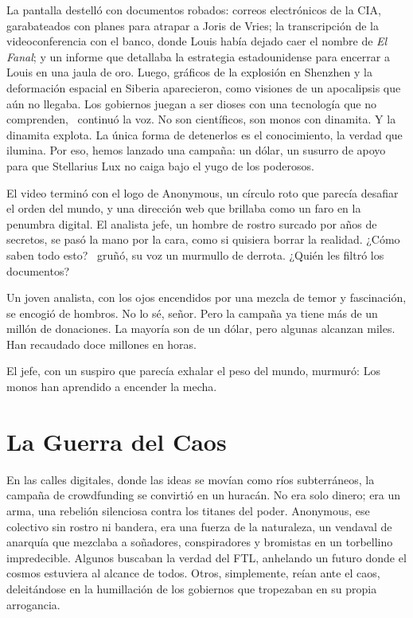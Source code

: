 La pantalla destelló con documentos robados: correos electrónicos de la CIA, garabateados con planes para atrapar a Joris de Vries; la transcripción de la videoconferencia con el banco, donde Louis había dejado caer el nombre de \emph{El Fanal}; y un informe que detallaba la estrategia estadounidense para encerrar a Louis en una jaula de oro. Luego, gráficos de la explosión en Shenzhen y la deformación espacial en Siberia aparecieron, como visiones de un apocalipsis que aún no llegaba. \glqq Los gobiernos juegan a ser dioses con una tecnología que no comprenden,\grqq~ continuó la voz. \glqq No son científicos, son monos con dinamita. Y la dinamita explota. La única forma de detenerlos es el conocimiento, la verdad que ilumina. Por eso, hemos lanzado una campaña: un dólar, un susurro de apoyo para que Stellarius Lux no caiga bajo el yugo de los poderosos.\grqq

El video terminó con el logo de Anonymous, un círculo roto que parecía desafiar el orden del mundo, y una dirección web que brillaba como un faro en la penumbra digital. El analista jefe, un hombre de rostro surcado por años de secretos, se pasó la mano por la cara, como si quisiera borrar la realidad. \glqq ¿Cómo saben todo esto?\grqq~ gruñó, su voz un murmullo de derrota. \glqq ¿Quién les filtró los documentos?\grqq

Un joven analista, con los ojos encendidos por una mezcla de temor y fascinación, se encogió de hombros. \glqq No lo sé, señor. Pero la campaña ya tiene más de un millón de donaciones. La mayoría son de un dólar, pero algunas alcanzan miles. Han recaudado doce millones en horas.\grqq

El jefe, con un suspiro que parecía exhalar el peso del mundo, murmuró: \glqq Los monos han aprendido a encender la mecha.\grqq

\section{La Guerra del Caos}

En las calles digitales, donde las ideas se movían como ríos subterráneos, la campaña de crowdfunding se convirtió en un huracán. No era solo dinero; era un arma, una rebelión silenciosa contra los titanes del poder. Anonymous, ese colectivo sin rostro ni bandera, era una fuerza de la naturaleza, un vendaval de anarquía que mezclaba a soñadores, conspiradores y bromistas en un torbellino impredecible. Algunos buscaban la verdad del FTL, anhelando un futuro donde el cosmos estuviera al alcance de todos. Otros, simplemente, reían ante el caos, deleitándose en la humillación de los gobiernos que tropezaban en su propia arrogancia.

